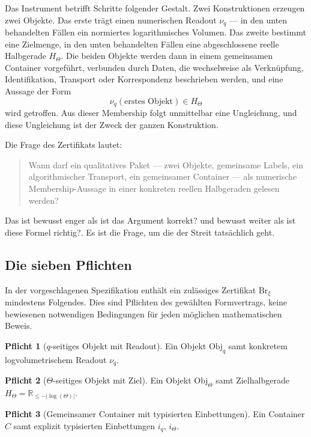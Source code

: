 \documentclass[11pt,a4paper]{article}
\theoremstyle{definition}
\newtheorem{obligation}{Pflicht}
\newcommand{\Brxi}{\mathrm{Br}_{\xi}}
\begin{document}
Das Instrument betrifft Schritte folgender Gestalt. Zwei Konstruktionen erzeugen
zwei Objekte. Das erste trägt einen numerischen Readout $\nu_q$ --- in den unten
behandelten Fällen ein normiertes logarithmisches Volumen. Das zweite bestimmt
eine Zielmenge, in den unten behandelten Fällen eine abgeschlossene reelle
Halbgerade $H_\Theta$. Die beiden Objekte werden dann in einem gemeinsamen
Container vorgeführt, verbunden durch Daten, die wechselweise als Verknüpfung,
Identifikation, Transport oder Korrespondenz beschrieben werden, und eine Aussage
der Form
\[
  \nu_q(\text{erstes Objekt}) \in H_\Theta
\]
wird getroffen. Aus dieser Membership folgt unmittelbar eine Ungleichung, und
diese Ungleichung ist der Zweck der ganzen Konstruktion.

Die Frage des Zertifikats lautet:

\begin{quote}
Wann darf ein qualitatives Paket --- zwei Objekte, gemeinsame Labels, ein
algorithmischer Transport, ein gemeinsamer Container --- als numerische
Membership-Aussage in einer konkreten reellen Halbgeraden gelesen werden?
\end{quote}

Das ist bewusst enger als \glqq ist das Argument korrekt?\grqq{} und bewusst weiter als \glqq ist
diese Formel richtig?\grqq. Es ist die Frage, um die der Streit tatsächlich geht.

\subsection{Die sieben Pflichten}
\label{sec:obligations}

In der vorgeschlagenen Spezifikation enthält ein zulässiges Zertifikat $\Brxi$
mindestens Folgendes. Dies sind Pflichten des gewählten Formvertrags, keine
bewiesenen notwendigen Bedingungen für jeden möglichen mathematischen Beweis.

\begin{obligation}[$q$-seitiges Objekt mit Readout]
Ein Objekt $\mathrm{Obj}_q$ samt konkretem logvolumetrischem Readout $\nu_q$.
\end{obligation}

\begin{obligation}[$\Theta$-seitiges Objekt mit Ziel]
Ein Objekt $\mathrm{Obj}_\Theta$ samt Zielhalbgerade
$H_\Theta = \mathbb{R}_{\le -|\log(\Theta)|}$.
\end{obligation}

\begin{obligation}[Gemeinsamer Container mit typisierten Einbettungen]
Ein Container $C$ samt explizit typisierten Einbettungen $i_q$, $i_\Theta$.
\end{obligation}
\end{document}
